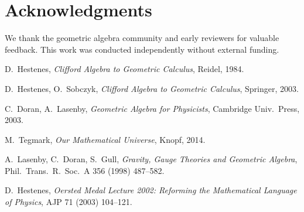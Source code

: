 \documentclass[11pt,a4paper]{article}
\theoremstyle{definition}
\theoremstyle{plain}
\theoremstyle{remark}
\begin{document}
\section*{Acknowledgments}
We thank the geometric algebra community and early reviewers for valuable feedback. This work was conducted independently without external funding.

\vspace{1em}

\begin{thebibliography}{99}\setlength{\itemsep}{2pt}
D.~Hestenes, \emph{Clifford Algebra to Geometric Calculus}, Reidel, 1984.

D.~Hestenes, O.~Sobczyk, \emph{Clifford Algebra to Geometric Calculus}, Springer, 2003.

C.~Doran, A.~Lasenby, \emph{Geometric Algebra for Physicists}, Cambridge Univ.\ Press, 2003.

M.~Tegmark, \emph{Our Mathematical Universe}, Knopf, 2014.

A.~Lasenby, C.~Doran, S.~Gull, \emph{Gravity, Gauge Theories and Geometric Algebra}, Phil.\ Trans.\ R.\ Soc.\ A 356 (1998) 487--582.

D.~Hestenes, \emph{Oersted Medal Lecture 2002: Reforming the Mathematical Language of Physics}, AJP 71 (2003) 104--121.

\end{thebibliography}

\end{document}
